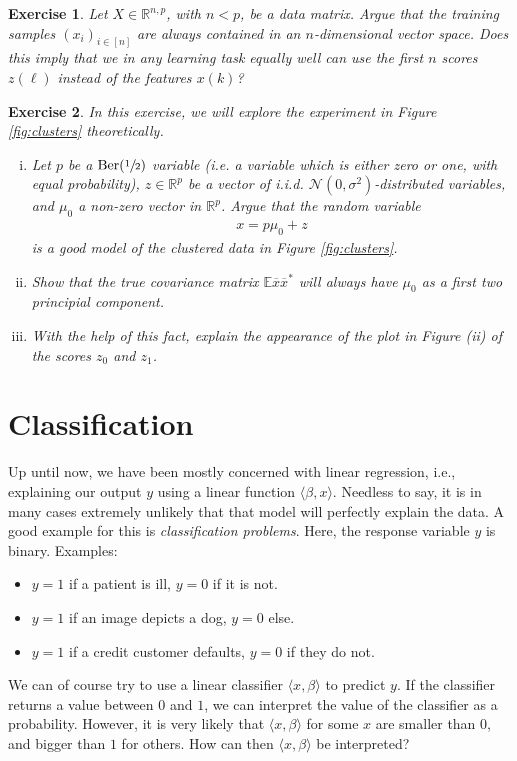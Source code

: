 \documentclass{article}
\newcommand{\erw}{\mathbb{E}} %
\newcommand{\sprod}[1]{\langle #1 \rangle}
\newcommand{\calN}{\mathcal{N}}
\newcommand{\R}{\mathbb{R}}
\newtheorem{exercise}{Exercise}
\begin{document}
\begin{exercise}
    Let $X\in \R^{n,p}$, with $n<p$, be a data matrix. Argue that the training samples $(x_i)_{i \in [n]}$ are always contained in an $n$-dimensional vector space. Does this imply that we in any learning task equally well can use the first $n$ scores $z(\ell)$ instead of the features $x(k)$?
\end{exercise}

\begin{exercise}
    In this exercise, we will explore the experiment in Figure \ref{fig:clusters} theoretically.

    \begin{enumerate}[(i)]
        \item Let $p$ be a $\mathrm{Ber}(\sfrac{1}{2})$ variable (i.e. a variable which is either zero or one, with equal probability), $z\in \R^p$ be a vector of i.i.d. $\calN(0,\sigma^2)$-distributed variables, and $\mu_0$ a non-zero vector in $\R^p$. Argue that the random variable
        \begin{align*}
            x = p\mu_0 + z
        \end{align*}
        is a good model of the clustered data in Figure \ref{fig:clusters}.
        \item Show that the true covariance matrix $\erw{\overline{x}\overline{x}^*}$ will always have $\mu_0$ as a first two principial component. 
        \item With the help of this fact, explain the appearance of the plot in Figure (ii) of the scores $z_0$ and $z_1$. 
    \end{enumerate}
\end{exercise}


\section{Classification}
Up until now, we have been mostly concerned with linear regression, i.e., explaining our output $y$ using a linear function $\sprod{\beta,x}$. Needless to say, it is in many cases extremely unlikely that that model will perfectly explain the data. A good example for this is \emph{classification problems}. Here, the response variable $y$ is binary. Examples:
\begin{itemize}
    \item $y=1$ if a patient is ill, $y=0$ if it is not.
    \item $y=1$ if an image depicts a dog, $y=0$ else.
    \item $y=1$ if a credit customer defaults, $y=0$ if they do not.
\end{itemize}
We can of course try to use a linear classifier $\sprod{x,\beta}$ to predict $y$. If the classifier returns a value between $0$ and $1$, we can interpret the value of the classifier as a probability. However, it is very likely that $\sprod{x,\beta}$ for some $x$ are smaller than $0$, and bigger than $1$ for others. How can then $\sprod{x,\beta}$ be interpreted?
\end{document}
